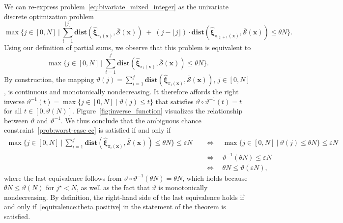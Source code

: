 \documentclass[nonblindrev]{informs2017}
\newcommand{\bmh}[1]{\hat{\bm{#1}}}
\newcommand{\1}[1]{\mathds{1}{\left(#1\right)}}
\begin{document}
We can re-express problem~\eqref{eq:bivariate_mixed_integer} as the univariate discrete optimization problem
\begin{equation*}
\max \bigg\{ j \in [0, N] ~\bigg|~ \sum_{i = 1}^{\lfloor j \rfloor} \mathbf{dist}(\bmh{\xi}_{\pi_i (\bm{x})}, \bar{\mathcal{S}} (\bm{x})) \; + \; (j - \lfloor j \rfloor) \cdot \mathbf{dist}(\bmh{\xi}_{\pi_{\lfloor j \rfloor + 1} (\bm{x})}, \bar{\mathcal{S}} (\bm{x})) \leq \theta N \bigg\}.
\end{equation*}
Using our definition of partial sums, we observe that this problem is equivalent to
\begin{equation*}
\max \bigg\{ j \in [0, N] ~\bigg|~ \sum_{i = 1}^j \mathbf{dist}(\bmh{\xi}_{\pi_i (\bm{x})}, \bar{\mathcal{S}} (\bm{x})) \leq \theta N \bigg\}.
\end{equation*}
By construction, the mapping $\vartheta (j) = \sum_{i = 1}^j \mathbf{dist}(\bmh{\xi}_{\pi_i (\bm{x})}, \bar{\mathcal{S}} (\bm{x}))$, $j \in [0, N]$, is continuous and monotonically nondecreasing. It therefore affords the right inverse $\vartheta^{-1} (t) = \max \{ j \in [0, N] \mid \vartheta(j) \leq t \}$ that satisfies $\vartheta \circ \vartheta^{-1} (t) = t$ for all $t \in [0, \vartheta(N)]$. Figure~\ref{fig:inverse_function} visualizes the relationship between $\vartheta$ and $\vartheta^{-1}$. We thus conclude that the ambiguous chance constraint~\eqref{prob:worst-case cc} is satisfied if and only if
\begin{align*}
\max \bigg\{ j \in [0, N] ~\bigg|~ \sum_{i = 1}^j \mathbf{dist}(\bmh{\xi}_{\pi_i (\bm{x})}, \bar{\mathcal{S}} (\bm{x})) \leq \theta N \bigg\} \leq \varepsilon N \quad
&\Longleftrightarrow \quad \max \{ j \in [0, N] ~|~ \vartheta (j) \leq \theta N \} \leq \varepsilon N \\
&\Longleftrightarrow \quad \vartheta^{-1} (\theta N) \leq \varepsilon N \\
&\Longleftrightarrow \quad \theta N \leq \vartheta (\varepsilon N),
\end{align*}
where the last equivalence follows from $\vartheta \circ \vartheta^{-1} (\theta N) = \theta N$, which holds because $\theta N \leq \vartheta(N)$ for $j^\star < N$, as well as the fact that $\vartheta$ is monotonically nondecreasing. By definition, the right-hand side of the last equivalence holds if and only if~\eqref{equivalence:theta positive} in the statement of the theorem is satisfied.
\hfill \Halmos
\endproof
\end{document}
